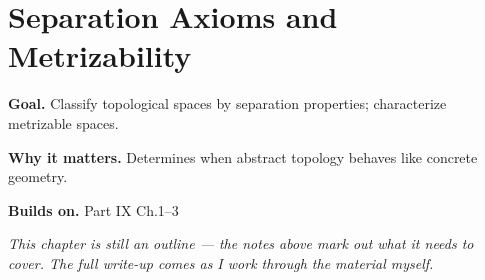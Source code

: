 \chapter{Separation Axioms and Metrizability}
\label{ch:09-topology-04}

\begin{chapterintro}
\textbf{Goal.} Classify topological spaces by separation properties; characterize metrizable spaces.

\textbf{Why it matters.} Determines when abstract topology behaves like concrete geometry.

\textbf{Builds on.} Part IX Ch.1–3
\end{chapterintro}

\textit{This chapter is still an outline --- the notes above mark out what it needs to cover. The full write-up comes as I work through the material myself.}

